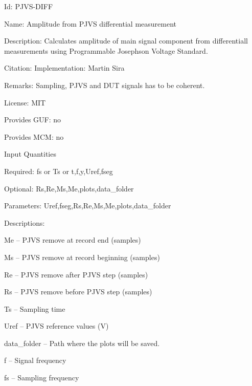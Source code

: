 \begin{tightdesc}
\item [Id:] PJVS-DIFF
\item [Name:] Amplitude from PJVS differential measurement
\item [Description:] Calculates amplitude of main signal component from differentiall measurements using Programmable Josephson Voltage Standard.
\item [Citation:] Implementation: Martin Sira
\item [Remarks:] Sampling, PJVS and DUT signals has to be coherent.
\item [License:] MIT
\item [Provides GUF:] no
\item [Provides MCM:] no
\item [Input Quantities] \rule{0em}{0em}
    \begin{tightdesc}
    \item [Required:] 
        \textsf{fs} or \textsf{Ts} or \textsf{t},\enspace \textsf{f},\enspace \textsf{y},\enspace \textsf{Uref},\enspace \textsf{fseg}
    \item [Optional:] 
        \textsf{Rs},\enspace \textsf{Re},\enspace \textsf{Ms},\enspace \textsf{Me},\enspace \textsf{plots},\enspace \textsf{data\_folder}
    \item [Parameters:] 
        \textsf{Uref},\enspace \textsf{fseg},\enspace \textsf{Rs},\enspace \textsf{Re},\enspace \textsf{Ms},\enspace \textsf{Me},\enspace \textsf{plots},\enspace \textsf{data\_folder}
    \item [Descriptions:] \rule{0em}{0em}
        \begin{tightdesc}
            \item[\textsf{Me}] -- PJVS remove at record end (samples)
            \item[\textsf{Ms}] -- PJVS remove at record beginning (samples)
            \item[\textsf{Re}] -- PJVS remove after PJVS step (samples)
            \item[\textsf{Rs}] -- PJVS remove before PJVS step (samples)
            \item[\textsf{Ts}] -- Sampling time
            \item[\textsf{Uref}] -- PJVS reference values (V)
            \item[\textsf{data\_folder}] -- Path where the plots will be saved.
            \item[\textsf{f}] -- Signal frequency
            \item[\textsf{fs}] -- Sampling frequency

\end{tightdesc}
\end{tightdesc}
\end{tightdesc}
